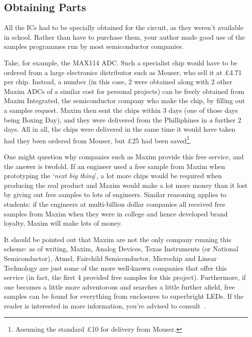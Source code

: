 \subsection{Obtaining Parts}

All the ICs had to be specially obtained for the circuit, as they weren't
available in school. Rather than have to purchase them, your author made good
use of the samples programmes run by most semiconductor companies.

Take, for example, the MAX114 ADC. Such a specialist chip would have to be
ordered from a large electronics distributor such as Mouser, who sell it at
\pounds 4.71 per chip. Instead, a number (in this case, 2 were obtained along
with 2 other Maxim ADCs of a similar cost for personal projects) can be freely
obtained from Maxim Integrated, the semiconductor company who make the chip, by
filling out a samples request. Maxim then sent the chips within 3 days (one of
those days being Boxing Day), and they were delivered from the Philliphines in a
further 2 days. All in all, the chips were delivered in the same time it would
have taken had they been ordered from Mouser, but \pounds 25 had been
saved\footnote{Assuming the standard \pounds 10 for delivery from Mouser.}.

One might question why companies such as Maxim provide this free service, and
the answer is twofold. If an engineer used a free sample from Maxim when
prototyping the `\textit{next big thing}', a lot more chips would be required
when producing the real product and Maxim would make a lot more money than it
lost by giving out free samples to lots of engineers. Similar reasoning applies
to students: if the engineers at multi-billion dollar companies all received
free samples from Maxim when they were in college and hence developed brand
loyalty, Maxim will make lots of money.

It should be pointed out that Maxim are not the only company running this
scheme: as of writing, Maxim, Analog Devices, Texas Instruments (or National
Semiconductor), Atmel, Fairchild Semiconductor, Microchip and Linear Technology
are just some of the more well-known companies that offer this service (in fact,
the first 4 provided free samples for this project). Furthermore, if one becomes
a little more adventorous and searches a little further afield, free samples can
be found for everything from enclosures to superbright LEDs. If the reader is
interested in more information, you're advised to
consult~\textcite{LadyAdaSamples}.

